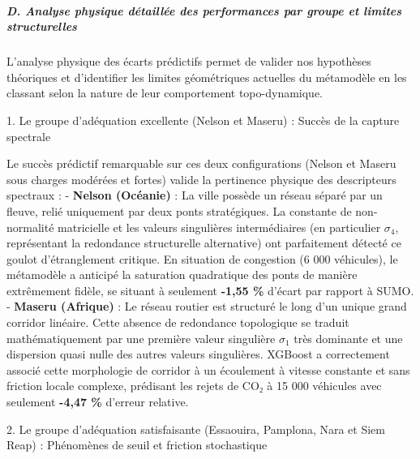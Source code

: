 \documentclass[10pt, a4paper]{article}
\begin{document}
\subparagraph{D. Analyse physique détaillée des performances par groupe
et limites
structurelles}\label{d.-analyse-physique-duxe9tailluxe9e-des-performances-par-groupe-et-limites-structurelles}

L'analyse physique des écarts prédictifs permet de valider nos
hypothèses théoriques et d'identifier les limites géométriques actuelles
du métamodèle en les classant selon la nature de leur comportement
topo-dynamique.

1. Le groupe d'adéquation excellente (Nelson et Maseru) : Succès de la
capture spectrale

Le succès prédictif remarquable sur ces deux configurations (Nelson et
Maseru sous charges modérées et fortes) valide la pertinence physique
des descripteurs spectraux : - \textbf{Nelson (Océanie)} : La ville
possède un réseau séparé par un fleuve, relié uniquement par deux ponts
stratégiques. La constante de non-normalité matricielle et les valeurs
singulières intermédiaires (en particulier \(\sigma_4\), représentant la
redondance structurelle alternative) ont parfaitement détecté ce goulot
d'étranglement critique. En situation de congestion (6 000 véhicules),
le métamodèle a anticipé la saturation quadratique des ponts de manière
extrêmement fidèle, se situant à seulement \textbf{-1,55 \%} d'écart par
rapport à SUMO. - \textbf{Maseru (Afrique)} : Le réseau routier est
structuré le long d'un unique grand corridor linéaire. Cette absence de
redondance topologique se traduit mathématiquement par une première
valeur singulière \(\sigma_1\) très dominante et une dispersion quasi
nulle des autres valeurs singulières. XGBoost a correctement associé
cette morphologie de corridor à un écoulement à vitesse constante et
sans friction locale complexe, prédisant les rejets de CO₂ à 15 000
véhicules avec seulement \textbf{-4,47 \%} d'erreur relative.

2. Le groupe d'adéquation satisfaisante (Essaouira, Pamplona, Nara et
Siem Reap) : Phénomènes de seuil et friction stochastique
\end{document}

